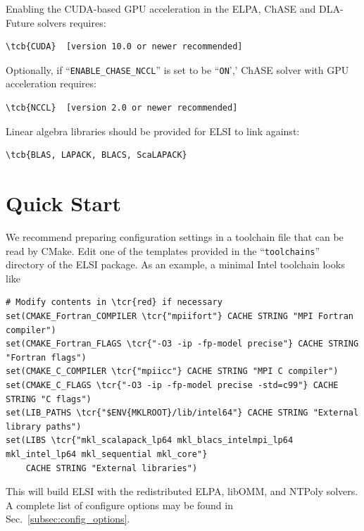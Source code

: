 \documentclass{report}
\newcommand{\tcb}[1]{\textcolor{blue}{#1}}
\newcommand{\tcr}[1]{\textcolor{red}{#1}}
\begin{document}
Enabling the CUDA-based GPU acceleration in the ELPA, ChASE and DLA-Future solvers requires:
\begin{Verbatim}[commandchars=\\\{\}]
\tcb{CUDA}  [version 10.0 or newer recommended]
\end{Verbatim}

Optionally, if ``\texttt{ENABLE\_CHASE\_NCCL}'' is set to be  ``\texttt{ON}','
ChASE solver with GPU acceleration requires:
\begin{Verbatim}[commandchars=\\\{\}]
\tcb{NCCL}  [version 2.0 or newer recommended]
\end{Verbatim}

Linear algebra libraries should be provided for ELSI to link against:
\begin{Verbatim}[commandchars=\\\{\}]
\tcb{BLAS, LAPACK, BLACS, ScaLAPACK}
\end{Verbatim}

\section{Quick Start}
\label{sec:quick}
We recommend preparing configuration settings in a toolchain file that can be read by CMake. Edit one of the templates provided in the ``\texttt{toolchains}'' directory of the ELSI package. As an example, a minimal Intel toolchain looks like
\begin{tcolorbox}
\begin{Verbatim}[commandchars=\\\{\}]
# Modify contents in \tcr{red} if necessary
set(CMAKE_Fortran_COMPILER \tcr{"mpiifort"} CACHE STRING "MPI Fortran compiler")
set(CMAKE_Fortran_FLAGS \tcr{"-O3 -ip -fp-model precise"} CACHE STRING "Fortran flags")
set(CMAKE_C_COMPILER \tcr{"mpiicc"} CACHE STRING "MPI C compiler")
set(CMAKE_C_FLAGS \tcr{"-O3 -ip -fp-model precise -std=c99"} CACHE STRING "C flags")
set(LIB_PATHS \tcr{"$ENV{MKLROOT}/lib/intel64"} CACHE STRING "External library paths")
set(LIBS \tcr{"mkl_scalapack_lp64 mkl_blacs_intelmpi_lp64 mkl_intel_lp64 mkl_sequential mkl_core"}
    CACHE STRING "External libraries")
\end{Verbatim}
\end{tcolorbox}

This will build ELSI with the redistributed ELPA, libOMM, and NTPoly solvers. A complete list of configure options may be found in Sec.~\ref{subsec:config_options}.
\end{document}
